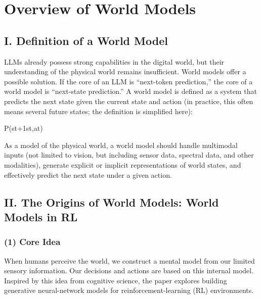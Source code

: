 \setcounter{section}{0}

\hypertarget{overview-of-world-models}{%
\section{Overview of World Models}\label{overview-of-world-models}}

\hypertarget{i.-definition-of-a-world-model}{%
\subsection{I. Definition of a World Model}\label{i.-definition-of-a-world-model}}

LLMs already possess strong capabilities in the digital world, but their understanding of the physical world remains insufficient. World models offer a possible solution. If the core of an LLM is ``next-token prediction,'' the core of a world model is ``next-state prediction.'' A world model is defined as a system that predicts the next state given the current state and action (in practice, this often means several future states; the definition is simplified here):

P(st+1\textbar st,at)

As a model of the physical world, a world model should handle multimodal inputs (not limited to vision, but including sensor data, spectral data, and other modalities), generate explicit or implicit representations of world states, and effectively predict the next state under a given action.

\hypertarget{ii.-the-origins-of-world-models-world-models-in-rl}{%
\subsection{II. The Origins of World Models: World Models in RL}\label{ii.-the-origins-of-world-models-world-models-in-rl}}

\hypertarget{core-idea-5}{%
\subsubsection{(1) Core Idea}\label{core-idea-5}}

When humans perceive the world, we construct a mental model from our limited sensory information. Our decisions and actions are based on this internal model. Inspired by this idea from cognitive science, the paper explores building generative neural-network models for reinforcement-learning (RL) environments.

